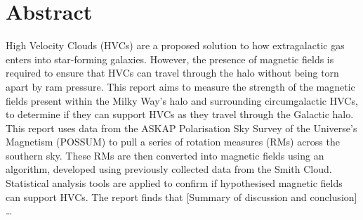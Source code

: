 \chapter*{Abstract}
\vspace{-1em}

High Velocity Clouds (HVCs) are a proposed solution to how extragalactic gas enters into star-forming galaxies. However, the presence of magnetic fields is required to ensure that HVCs can travel through the halo without being torn apart by ram pressure. This report aims to measure the strength of the magnetic fields present within the Milky Way’s halo and surrounding circumgalactic HVCs, to determine if they can support HVCs as they travel through the Galactic halo. This report uses data from the ASKAP Polarisation Sky Survey of the Universe’s Magnetism (POSSUM) to pull a series of rotation measures (RMs) across the southern sky. These RMs are then converted into magnetic fields using an algorithm, developed using previously collected data from the Smith Cloud. Statistical analysis tools are applied to confirm if hypothesised magnetic fields can support HVCs. The report finds that [Summary of discussion and conclusion] …

